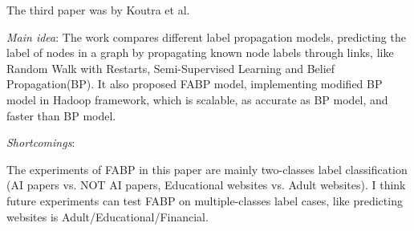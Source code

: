 The third paper was by Koutra et al.
\cite{Koutra:2011wa}
\begin{itemize*}
\item {\em Main idea}: The work compares different label propagation models, predicting the label of nodes in a graph by propagating known node labels through links, like Random Walk with Restarts, Semi-Supervised Learning and Belief Propagation(BP). It also proposed FABP model, implementing modified BP model in Hadoop framework, which is scalable, as accurate as BP model, and faster than BP model.
\item {\em Shortcomings}:
		\begin{itemize*}
		\item
			The experiments of FABP in this paper are mainly two-classes label classification (AI papers vs. NOT AI papers, Educational websites vs. Adult websites). I think future experiments can test FABP on multiple-classes label cases, like predicting websites is Adult/Educational/Financial.
		\end{itemize*}
\end{itemize*}



